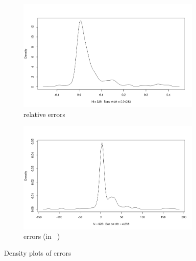 \documentclass{article}
\begin{document}
\begin{figure}
  \centering
  \begin{subfigure}[t]{0.49\textwidth}
    \centering
    \includegraphics[width=\textwidth]{../local_experiments/io_memory_tests/plots/posterior_density_rel.png}
    \caption{relative errors}
  \end{subfigure}
  \begin{subfigure}[t]{0.49\textwidth}
    \centering
    \includegraphics[width=\textwidth]{../local_experiments/io_memory_tests/plots/posterior_density_errors.png}
    \caption{errors (in \si{\mebi\byte})}
  \end{subfigure}
  \caption{Density plots of errors}
  \label{fig:posterior_densities}
\end{figure}
\end{document}
